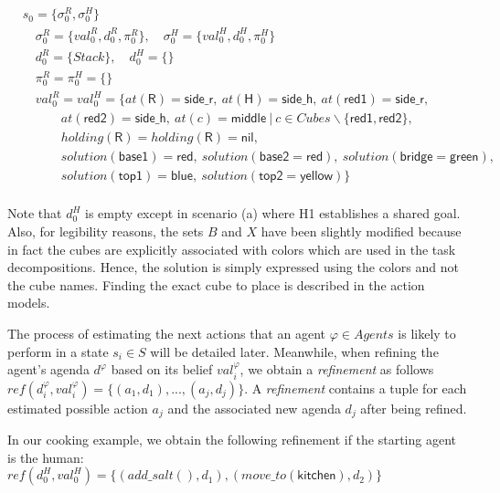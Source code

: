 {\small
\begin{align*}
&s_0 = \{\sigma^R_0, \sigma^H_0\} \\
&\quad \sigma^R_0 = \{ val^R_0, d^R_0, \pi^R_0 \}, \quad \sigma^H_0 = \{ val^H_0, d^H_0, \pi^H_0 \} \\
&\quad d^R_0 = \{ Stack \}, \quad d^H_0 = \{  \} \\
&\quad \pi^R_0 = \pi^H_0 = \{  \} \\
&\quad val^R_0 = val^H_0 = \{at(\textsf{R}) = \textsf{side\_r},~at(\textsf{H}) = \textsf{side\_h}, ~at(\textsf{red1}) = \textsf{side\_r}, \\
&\quad \quad \quad at(\textsf{red2}) = \textsf{side\_h}, ~at(c) = \textsf{middle} ~|~ c \in Cubes\backslash\{ \textsf{red1}, \textsf{red2} \}, \\
&\quad \quad \quad holding(\textsf{R}) = holding(\textsf{R}) = \textsf{nil}, \\
&\quad \quad \quad solution(\textsf{base1}) = \textsf{red}, ~solution(\textsf{base2} = \textsf{red}), ~solution(\textsf{bridge} = \textsf{green}),   \\
&\quad \quad \quad solution(\textsf{top1}) = \textsf{blue}, ~solution(\textsf{top2} = \textsf{yellow}) \}  \\
\end{align*}
}

Note that $d^H_0$ is empty except in scenario (a) where H1 establishes a shared goal. Also, for legibility reasons, the sets $B$ and $X$ have been slightly modified because in fact the cubes are explicitly associated with colors which are used in the task decompositions. Hence, the solution is simply expressed using the colors and not the cube names. Finding the exact cube to place is described in the action models.

The process of estimating the next actions that an agent $\varphi \in Agents$ is likely to perform in a state $s_i \in S$ will be detailed later. Meanwhile, when refining the agent's agenda $d^{\varphi}$ based on its belief $val^\varphi_i$, we obtain a \textit{refinement} as follows $\textit{ref}(d^\varphi_i, val^\varphi_i)= \{ (a_1,d_1),...,(a_j,d_j) \}$. 
A \textit{refinement} contains a tuple for each estimated possible action $a_j$ and the associated new agenda $d_j$ after being refined. 

In our cooking example, we obtain the following refinement if the starting agent is the human:\\
{\small
$\textit{ref}(d^H_0, val^H_0) = \{ (add\_salt(),d_1), (move\_to(\textsf{kitchen}),d_2) \}$
}

